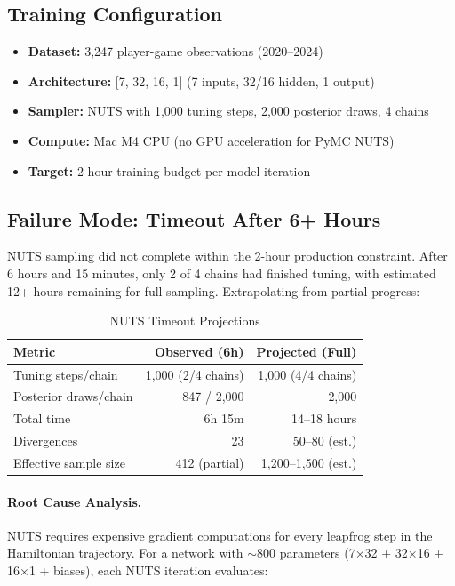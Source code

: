\subsection{Training Configuration}

\begin{itemize}
  \item \textbf{Dataset:} 3,247 player-game observations (2020--2024)
  \item \textbf{Architecture:} [7, 32, 16, 1] (7 inputs, 32/16 hidden, 1 output)
  \item \textbf{Sampler:} NUTS with 1,000 tuning steps, 2,000 posterior draws, 4 chains
  \item \textbf{Compute:} Mac M4 CPU (no GPU acceleration for PyMC NUTS)
  \item \textbf{Target:} 2-hour training budget per model iteration
\end{itemize}

\subsection{Failure Mode: Timeout After 6+ Hours}

NUTS sampling did not complete within the 2-hour production constraint. After 6 hours and 15 minutes, only 2 of 4 chains had finished tuning, with estimated 12+ hours remaining for full sampling. Extrapolating from partial progress:

\begin{table}[!ht]
\centering
\caption{NUTS Timeout Projections}
\label{tab:nuts-timeout}
\begin{tabular}{@{} l r r @{}}
\toprule
\textbf{Metric}  & \textbf{Observed (6h)}  & \textbf{Projected (Full)} \\
\midrule
Tuning steps/chain & 1,000 (2/4 chains) & 1,000 (4/4 chains) \\
Posterior draws/chain & 847 / 2,000 & 2,000 \\
Total time & 6h 15m & 14--18 hours \\
Divergences & 23 & 50--80 (est.) \\
Effective sample size & 412 (partial) & 1,200--1,500 (est.) \\
\bottomrule
\end{tabular}
\end{table}

\paragraph{Root Cause Analysis.}
NUTS requires expensive gradient computations for every leapfrog step in the Hamiltonian trajectory. For a network with $\sim$800 parameters (7×32 + 32×16 + 16×1 + biases), each NUTS iteration evaluates:

